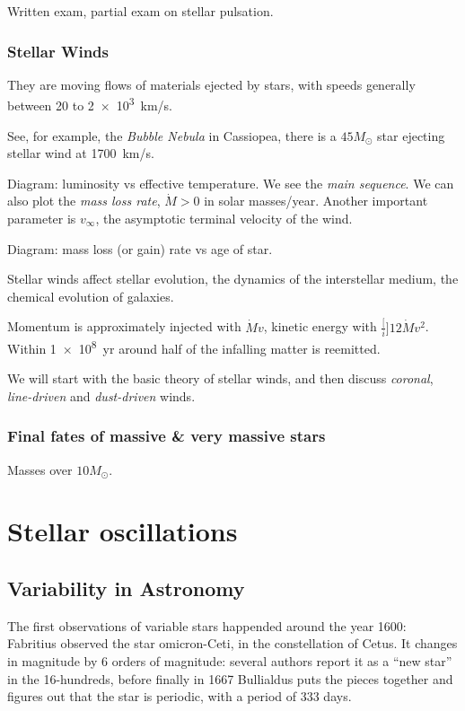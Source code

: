 \documentclass[main.tex]{subfiles}
\begin{document}
Written exam, partial exam on stellar pulsation.



\subsubsection{Stellar Winds}

They are moving flows of materials ejected by stars, with speeds generally between 20 to \SI{2e3}{km/s}.

See, for example, the \emph{Bubble Nebula} in Cassiopea, there is a \(45 M_{\odot}\) star ejecting stellar wind at \SI{1700}{km/s}.

Diagram: luminosity vs effective temperature. We see the \emph{main sequence}.
We can also plot the \emph{mass loss rate}, \(\dot{M}>0 \) in solar masses/year.
Another important parameter is \(v_\infty\), the asymptotic terminal velocity of the wind.

Diagram: mass loss (or gain) rate vs age of star.

Stellar winds affect stellar evolution, the dynamics of the interstellar medium, the chemical evolution of galaxies.

Momentum is approximately injected with \(\dot{M} v\), kinetic energy with \(\frac[i]{1}{2} \dot{M} v^2\).
Within \SI{1e8}{yr} around half of the infalling matter is reemitted.

We will start with the basic theory of stellar winds, and then discuss \emph{coronal}, \emph{line-driven} and \emph{dust-driven} winds.

\subsubsection{Final fates of massive \& very massive stars}

Masses over \(10 M_{\odot}\).

\section{Stellar oscillations}

\subsection{Variability in Astronomy}

The first observations of variable stars happended around the year 1600: Fabritius observed the star omicron-Ceti, in the constellation of Cetus. It changes in magnitude by 6 orders of magnitude: several authors report it as a ``new star'' in the 16-hundreds, before finally in 1667 Bullialdus puts the pieces together and figures out that the star is periodic, with a period of 333 days. 
\end{document}
